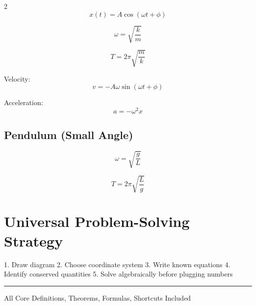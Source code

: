 \documentclass[10pt,landscape]{article}
\begin{document}
\begin{multicols}{2}
\[
x(t) = A\cos(\omega t + \phi)
\]

\[
\omega = \sqrt{\frac{k}{m}}
\]

\[
T = 2\pi\sqrt{\frac{m}{k}}
\]

Velocity:
\[
v = -A\omega\sin(\omega t + \phi)
\]

Acceleration:
\[
a = -\omega^2 x
\]

\subsection*{Pendulum (Small Angle)}

\[
\omega = \sqrt{\frac{g}{L}}
\]

\[
T = 2\pi\sqrt{\frac{L}{g}}
\]


\section*{Universal Problem-Solving Strategy}

1. Draw diagram  
2. Choose coordinate system  
3. Write known equations  
4. Identify conserved quantities  
5. Solve algebraically before plugging numbers  

\vfill
\hrule
\centerline{All Core Definitions, Theorems, Formulas, Shortcuts Included}

\end{multicols}
\end{document}
